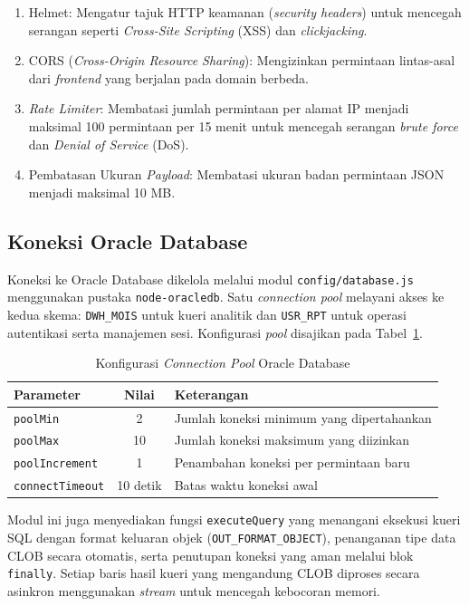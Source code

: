 \begin{enumerate}
    \item Helmet: Mengatur tajuk HTTP keamanan (\textit{security headers}) untuk mencegah serangan seperti \textit{Cross-Site Scripting} (XSS) dan \textit{clickjacking}.
    \item CORS\label{abbr:CORS} (\textit{Cross-Origin Resource Sharing}): Mengizinkan permintaan lintas-asal dari \textit{frontend} yang berjalan pada domain berbeda.
    \item \textit{Rate Limiter}: Membatasi jumlah permintaan per alamat IP menjadi maksimal 100 permintaan per 15 menit untuk mencegah serangan \textit{brute force} dan \textit{Denial of Service} (DoS).
    \item Pembatasan Ukuran \textit{Payload}: Membatasi ukuran badan permintaan JSON menjadi maksimal 10 MB.
\end{enumerate}

\subsection{Koneksi Oracle Database}
\label{subsec:koneksi-oracle}

Koneksi ke Oracle Database dikelola melalui modul \texttt{config/database.js} menggunakan pustaka \texttt{node-oracledb}. Satu \textit{connection pool} melayani akses ke kedua skema: \texttt{DWH\_MOIS} untuk kueri analitik dan \texttt{USR\_RPT} untuk operasi autentikasi serta manajemen sesi. Konfigurasi \textit{pool} disajikan pada Tabel~\ref{tab:pool-config}.

\begin{table}[htbp]
\centering
\caption{Konfigurasi \textit{Connection Pool} Oracle Database}
\label{tab:pool-config}
\begin{tabular}{|p{4cm}|c|p{6cm}|}
\hline
\textbf{Parameter} & \textbf{Nilai} & \textbf{Keterangan} \\
\hline
\texttt{poolMin} & 2 & Jumlah koneksi minimum yang dipertahankan \\
\hline
\texttt{poolMax} & 10 & Jumlah koneksi maksimum yang diizinkan \\
\hline
\texttt{poolIncrement} & 1 & Penambahan koneksi per permintaan baru \\
\hline
\texttt{connectTimeout} & 10 detik & Batas waktu koneksi awal \\
\hline
\end{tabular}
\end{table}

Modul ini juga menyediakan fungsi \texttt{executeQuery} yang menangani eksekusi kueri SQL dengan format keluaran objek (\texttt{OUT\_FORMAT\_OBJECT}), penanganan tipe data CLOB secara otomatis, serta penutupan koneksi yang aman melalui blok \texttt{finally}. Setiap baris hasil kueri yang mengandung CLOB diproses secara asinkron menggunakan \textit{stream} untuk mencegah kebocoran memori.

